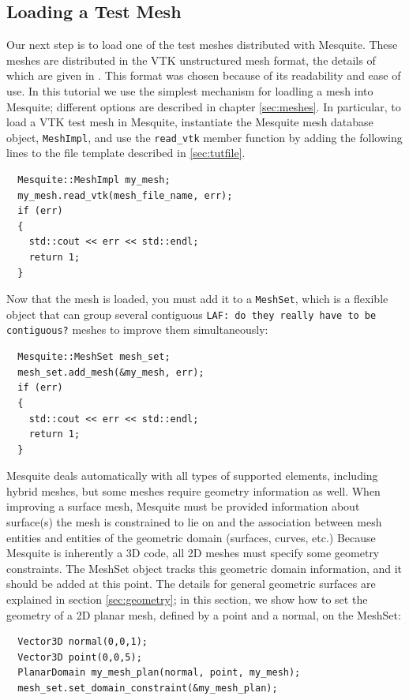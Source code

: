 \subsection{Loading a Test Mesh}
\label{sec:tutMesh}
Our next step is to load one of the test meshes distributed with
Mesquite.  These meshes are distributed in the VTK unstructured mesh
format, the details of which are given in \cite{VTKbook, VTKuml}. This
format was chosen because of its readability and ease of use.
In this tutorial we use
the simplest mechanism for loadling a mesh into Mesquite; different
options are described in chapter \ref{sec:meshes}.  In particular, to
load a VTK test mesh in Mesquite, instantiate the Mesquite mesh
database object,
\texttt{MeshImpl}, and use the \texttt{read\_vtk} member function by
adding the following lines to the file template described in
\ref{sec:tutfile}.
\begin{verbatim}
  Mesquite::MeshImpl my_mesh;
  my_mesh.read_vtk(mesh_file_name, err); 
  if (err) 
  {
    std::cout << err << std::endl;
    return 1;
  }
\end{verbatim}
Now that the mesh is loaded, you must add it to a {\tt MeshSet}, which
is a flexible object that can group several contiguous {\tt LAF: do
they really have to be contiguous?} meshes to improve them simultaneously:
\begin{verbatim}
  Mesquite::MeshSet mesh_set;
  mesh_set.add_mesh(&my_mesh, err); 
  if (err) 
  {
    std::cout << err << std::endl;
    return 1;
  }
\end{verbatim}
Mesquite deals automatically with all types of supported elements,
including hybrid meshes, but some meshes require geometry information
as well.  When improving a surface mesh, Mesquite must be provided information
about surface(s) the mesh is constrained to lie on and the association between
mesh entities and entities of the geometric domain (surfaces, curves, etc.)
Because Mesquite is inherently a 3D code, all 2D meshes must specify some
geometry constraints.  The MeshSet object tracks this geometric
domain information, and it should be added at this point.  The details
for general geometric surfaces are explained in section
\ref{sec:geometry}; in this section,
we show how to set the geometry of a 2D planar mesh, defined by a
point and a normal, on the MeshSet:
\begin{verbatim}
  Vector3D normal(0,0,1);
  Vector3D point(0,0,5);
  PlanarDomain my_mesh_plan(normal, point, my_mesh);
  mesh_set.set_domain_constraint(&my_mesh_plan);
\end{verbatim}

